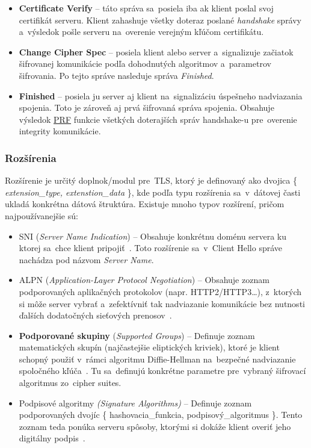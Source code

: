 \begin{itemize}
    \item \textbf{Certificate Verify} -- táto správa sa~posiela iba ak klient poslal svoj certifikát serveru. Klient zahashuje všetky doteraz poslané \textit{handshake} správy a~výsledok pošle serveru na~overenie verejným kľúčom certifikátu.

    \item \textbf{Change Cipher Spec} -- posiela klient alebo server a~signalizuje začiatok šifrovanej komunikácie podľa dohodnutých algoritmov a~parametrov šifrovania. Po tejto správe nasleduje správa \textit{Finished}.

    \item \textbf{Finished} -- posiela ju server aj klient na~signalizáciu úspešneho nadviazania spojenia. Toto je zároveň aj prvá šifrovaná správa spojenia. Obsahuje výsledok \hyperref[th:prf]{PRF} funkcie všetkých doterajších správ handshake-u pre~overenie integrity komunikácie.
\end{itemize}

\subsubsection{Rozšírenia}\label{th:extensions}
Rozšírenie je určitý doplnok/modul pre~TLS, ktorý je definovaný ako dvojica \{ \textit{extension\_type, extenstion\_data} \}, kde podľa typu rozšírenia sa~v~dátovej časti ukladá konkrétna dátová štruktúra. Existuje mnoho typov rozšírení, pričom najpoužívanejšie sú:
\begin{itemize}
    \item {SNI}\label{SNI} (\textit{Server Name Indication}) -- Obsahuje konkrétnu doménu servera ku ktorej sa~chce klient pripojiť~\cite{rfc6066}. Toto rozšírenie sa~v~Client Hello správe nachádza pod názvom \textit{Server Name}. 
        
    \item ALPN (\textit{Application-Layer Protocol Negotiation}) -- Obsahuje zoznam podporovaných aplikačných protokolov (napr. HTTP2/HTTP3\dots), z~ktorých si môže server vybrať a~zefektívniť tak nadviazanie komunikácie bez nutnosti ďalších dodatočných sieťových prenosov~\cite{rfc7301}.

    \item \textbf{Podporované skupiny} (\textit{Supported Groups})\label{th:supported_groups} -- Definuje zoznam matematických skupín (najčastejšie eliptických kriviek), ktoré je klient schopný použiť v~rámci algoritmu Diffie-Hellman na~bezpečné nadviazanie spoločného kľúča~\cite{rfc8422}. Tu sa~definujú konkrétne parametre pre~vybraný šifrovací algoritmus zo~cipher suites.

    \item Podpisové algoritmy \textit{(Signature Algorithms)} -- Definuje zoznam podporovaných dvojíc \{ hashovacia\_funkcia, podpisový\_algoritmus \}. Tento zoznam teda ponúka serveru spôsoby, ktorými si dokáže klient overiť jeho digitálny podpis~\cite{rfc5246}.
\end{itemize} 

